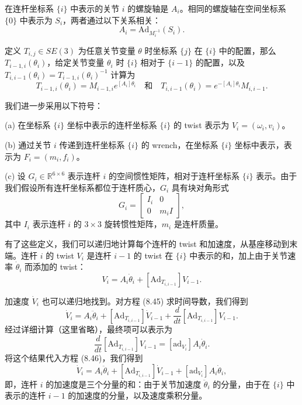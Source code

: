 \documentclass[12pt,a4paper]{article}
\begin{document}
在连杆坐标系 $\{i\}$ 中表示的关节 $i$ 的螺旋轴是 $A_i$。相同的螺旋轴在空间坐标系 $\{0\}$ 中表示为 $S_i$，两者通过以下关系相关：
\begin{equation}
A_i = \text{Ad}_{M_i^{-1}}(S_i).
\end{equation}

定义 $T_{i,j} \in SE(3)$ 为任意关节变量 $\theta$ 时坐标系 $\{j\}$ 在 $\{i\}$ 中的配置，那么 $T_{i-1,i}(\theta_i)$，给定关节变量 $\theta_i$ 时 $\{i\}$ 相对于 $\{i-1\}$ 的配置，以及 $T_{i,i-1}(\theta_i) = T_{i-1,i}(\theta_i)^{-1}$ 计算为
\begin{equation}
T_{i-1,i}(\theta_i) = M_{i-1,i}e^{[A_i]\theta_i} \quad \text{和} \quad T_{i,i-1}(\theta_i) = e^{-[A_i]\theta_i}M_{i,i-1}.
\end{equation}

我们进一步采用以下符号：

(a) 在坐标系 $\{i\}$ 坐标中表示的连杆坐标系 $\{i\}$ 的 twist 表示为 $V_i = (\omega_i, v_i)$。

(b) 通过关节 $i$ 传递到连杆坐标系 $\{i\}$ 的 wrench，在坐标系 $\{i\}$ 坐标中表示，表示为 $F_i = (m_i, f_i)$。

(c) 设 $G_i \in \mathbb{R}^{6 \times 6}$ 表示连杆 $i$ 的空间惯性矩阵，相对于连杆坐标系 $\{i\}$ 表示。由于我们假设所有连杆坐标系都位于连杆质心，$G_i$ 具有块对角形式
\begin{equation}
G_i = \begin{bmatrix} I_i & 0 \\ 0 & m_i I \end{bmatrix}, \label{eq:8.44}
\end{equation}
其中 $I_i$ 表示连杆 $i$ 的 $3 \times 3$ 旋转惯性矩阵，$m_i$ 是连杆质量。

有了这些定义，我们可以递归地计算每个连杆的 twist 和加速度，从基座移动到末端。连杆 $i$ 的 twist $V_i$ 是连杆 $i-1$ 的 twist 在 $\{i\}$ 中表示的和，加上由于关节速率 $\dot{\theta}_i$ 而添加的 twist：
\begin{equation}
V_i = A_i \dot{\theta}_i + [\text{Ad}_{T_{i,i-1}}]V_{i-1}. \label{eq:8.45}
\end{equation}

加速度 $\dot{V}_i$ 也可以递归地找到。对方程 (8.45) 求时间导数，我们得到
\begin{equation}
\dot{V}_i = A_i \ddot{\theta}_i + [\text{Ad}_{T_{i,i-1}}]\dot{V}_{i-1} + \frac{d}{dt}[\text{Ad}_{T_{i,i-1}}]V_{i-1}. \label{eq:8.46}
\end{equation}
经过详细计算（这里省略），最终项可以表示为
\begin{equation}
\frac{d}{dt}[\text{Ad}_{T_{i,i-1}}]V_{i-1} = [\text{ad}_{V_i}]A_i \dot{\theta}_i.
\end{equation}
将这个结果代入方程 (8.46)，我们得到
\begin{equation}
\dot{V}_i = A_i \ddot{\theta}_i + [\text{Ad}_{T_{i,i-1}}]\dot{V}_{i-1} + [\text{ad}_{V_i}]A_i \dot{\theta}_i, \label{eq:8.47}
\end{equation}
即，连杆 $i$ 的加速度是三个分量的和：由于关节加速度 $\ddot{\theta}_i$ 的分量，由于在 $\{i\}$ 中表示的连杆 $i-1$ 的加速度的分量，以及速度乘积分量。
\end{document}
